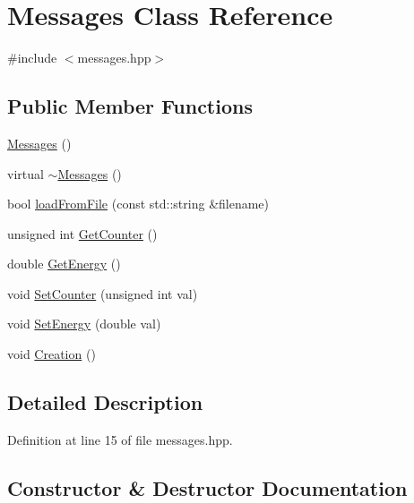 \hypertarget{class_messages}{}\section{Messages Class Reference}
\label{class_messages}


{\ttfamily \#include $<$messages.\+hpp$>$}

\subsection*{Public Member Functions}
\begin{DoxyCompactItemize}
\item 
\hyperlink{class_messages_abd3013dea54bfd87550739c3fa6e20d5}{Messages} ()
\item 
virtual \hyperlink{class_messages_ab0060ed5667e5dd2d47811df6c42d462}{$\sim$\+Messages} ()
\item 
bool \hyperlink{class_messages_a4263549c3f5c27b68279adbd7bcbcc30}{load\+From\+File} (const std\+::string \&filename)
\item 
unsigned int \hyperlink{class_messages_a256f8190d9ef6e25db6a5030f9805b5d}{Get\+Counter} ()
\item 
double \hyperlink{class_messages_ab33cb49f408b16cf1fa29b5f141921c4}{Get\+Energy} ()
\item 
void \hyperlink{class_messages_aecaad70bba58fd8d1a5640cb04088a2c}{Set\+Counter} (unsigned int val)
\item 
void \hyperlink{class_messages_a522996f78812e3a01e68214385db2cfd}{Set\+Energy} (double val)
\item 
void \hyperlink{class_messages_ac575287a8c19833d30480c5fb1769dfa}{Creation} ()
\end{DoxyCompactItemize}


\subsection{Detailed Description}


Definition at line 15 of file messages.\+hpp.



\subsection{Constructor \& Destructor Documentation}
\mbox{\label{class_messages_abd3013dea54bfd87550739c3fa6e20d5}} 

